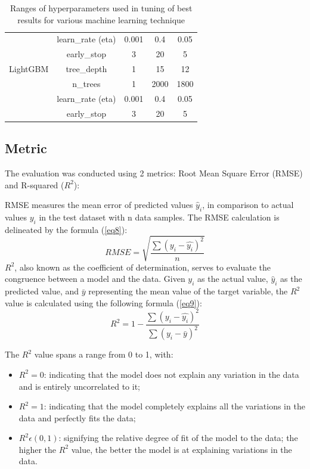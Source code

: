 \documentclass[10pt, a4paper, oneside]{article}
\begin{document}
\begin{table}
\begin{tabular}{ccccc}
                & learn\_rate (eta) & 0.001 & 0.4 & 0.05 \\
                & early\_stop & 3 & 20 & 5 \\
        \hline 
        LightGBM & tree\_depth & 1 & 15 & 12 \\
                 & n\_trees & 1 & 2000 & 1800 \\
                 & learn\_rate (eta) & 0.001 & 0.4 & 0.05 \\
                 & early\_stop & 3 & 20 & 5 \\
        \hline 
    \end{tabular}
    \caption{Ranges of hyperparameters used in tuning of best results for various machine learning technique}
    \label{tab:table2}
\end{table}


\subsection{Metric}
The evaluation was conducted using 2 metrics: Root Mean Square Error (RMSE) and R-squared (\(R^2\)):~\par
RMSE measures the mean error of predicted values \(\hat{y}_i\), in comparison to actual values \(y_i\) in the test dataset with n data samples. The RMSE calculation is delineated by the formula (\ref{eq8}):
\begin{equation} \label{eq8}
RMSE = \sqrt{\frac{\sum{(y_i-\hat{y_i})^2}}{n}}
\end{equation}
\hspace{0.5cm} \(R^2\), also known as the coefficient of determination, serves to evaluate the congruence between a model and the data. Given \(y_i\) as the actual value, \(\hat{y}_i\) as the predicted value, and \(\bar{y}\) representing the mean value of the target variable, the \(R^2\) value is calculated using the following formula (\ref{eq9}):
\begin{equation} \label{eq9}
R^2=1-\frac{\sum(y_i-\hat{y_i})^2}{\sum(y_i-\bar{y})^2}
\end{equation}

The \(R^2\) value spans a range from 0 to 1, with:
\begin{itemize}
    \item \(R^2=0\): indicating that the model does not explain any variation in the data and is entirely uncorrelated to it;
    \item \(R^2=1\): indicating that the model completely explains all the variations in the data and perfectly fits the data;
    \item \(R^2 \epsilon (0,1)\): signifying the relative degree of fit of the model to the data; the higher the \(R^2\) value, the better the model is at explaining variations in the data.
\end{itemize}
\end{document}

